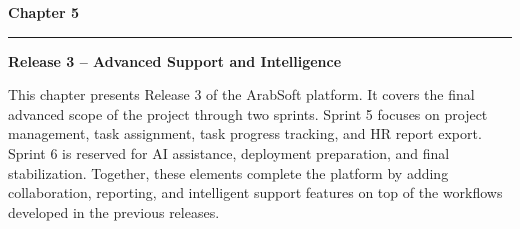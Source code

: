 
  \fancyhead[R]{}
  \fancyfoot[C]{\thepage}
  \pagestyle{fancy}


  \begin{center}
    {\fontsize{18}{22}\selectfont \textbf{Chapter 5}}
  \end{center}

  \vspace{0.3cm}

  \noindent\rule{\textwidth}{0.4pt}

  \vspace{0.3cm}

  \begin{center}
    {\fontsize{20}{24}\selectfont \textbf{Release 3 -- Advanced Support and Intelligence}}
  \end{center}

  \vspace{0.6cm}


  {\fontsize{12}{18}\selectfont
  \setlength{\parindent}{1.2cm}
  \setlength{\parskip}{6pt}

  \indent This chapter presents Release 3 of the ArabSoft platform. It covers the final advanced scope of the project through two sprints. Sprint 5 focuses on project management, task assignment, task progress tracking, and HR report export. Sprint 6 is reserved for AI assistance, deployment preparation, and final stabilization. Together, these elements complete the platform by adding collaboration, reporting, and intelligent support features on top of the workflows developed in the previous releases.

  }

  \vspace{6pt}


